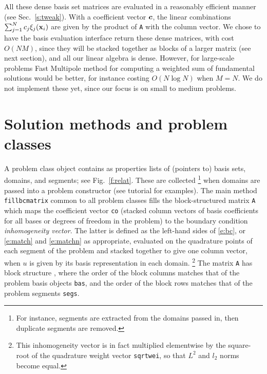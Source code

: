 \documentclass[12pt]{article}
\begin{document}
All these dense basis set matrices
are evaluated in a reasonably efficient manner
(see Sec.~\ref{s:tweak}).
With a coefficient vector ${\bm c}$, the linear combinations
$\sum_{j=1}^N c_j \xi_j(\textbf{x}_i)$ are given by the product
of {\tt A} with the column vector.
We chose to have the basis evaluation interface return these dense
matrices, with cost $O(NM)$,
since they will be stacked together as blocks of a larger
matrix (see next section), and all our linear algebra is dense.
However, for large-scale problems Fast Multipole method for computing
a weighted sum of fundamental solutions would be
better, for instance costing $O(N\log N)$ when $M=N$.
We do not implement these yet, since our focus is on small to medium
problems.




\section{Solution methods and problem classes}

A problem class object contains as properties lists of (pointers to)
basis sets, domains, and segments; see Fig.~\ref{f:relat}.
These are collected%
  \footnote{For instance, segments are extracted from the domains passed in,
    then duplicate segments are removed.}
when domains are passed into a problem
constructor (see tutorial for examples).
The main method {\tt fillbcmatrix} common to all problem classes
fills the block-structured matrix {\tt A} which maps the
coefficient vector {\tt co} 
(stacked column vectors of basis coefficients for all
bases or degrees of freedom in the problem)
to the boundary condition {\em inhomogeneity vector}.
The latter is defined as the left-hand sides of
\eqref{e:bc}, or \eqref{e:match} and \eqref{e:matchn}
as appropriate, evaluated on the quadrature points
of each segment of the problem
and stacked together to give one column vector,
when $u$ is given by its basis representation in each domain.%
  \footnote{This inhomogeneity vector is in fact multiplied elementwise by the
    square-root of the quadrature weight vector {\tt sqrtwei},
    so that $L^2$ and $l_2$ norms become equal.}
The matrix {\tt A} has block structure \cite{polygonscatt}, where the
order of the block columns matches that of the problem basis
objects {\tt bas}, and the order of the block rows
matches that of the problem segments {\tt segs}.
\end{document}
